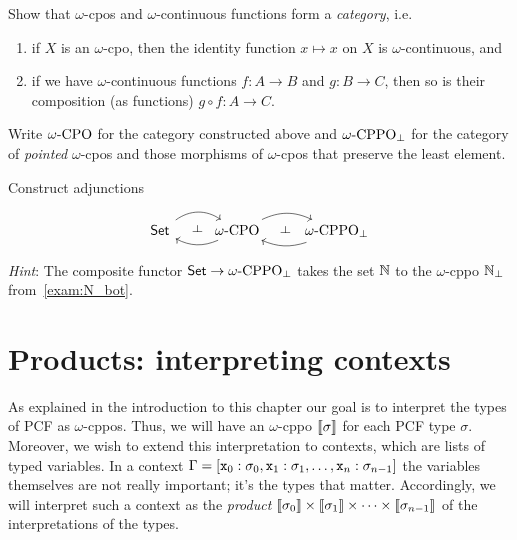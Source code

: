 \begin{exercise}\label{exer:category-of-cpos}
  Show that \(\omega\)-cpos and \(\omega\)-continuous functions form a
  \emph{category}, i.e.\
  \begin{enumerate}
  \item if \(X\) is an \(\omega\)-cpo, then the identity function
    \(x \mapsto x\) on \(X\) is \(\omega\)-continuous, and
  \item if we have \(\omega\)-continuous functions \(f \colon A \to B\) and
    \(g \colon B \to C\), then so is their composition (as functions)
    \(g \circ f \colon A \to C\). \qedhere
  \end{enumerate}
\end{exercise}

\begin{exercise}\label{exer:adjunctions}

  Write \(\omegaCPO\) for the category constructed above and \(\omegaCPPObot\)
  for the category of \emph{pointed} \(\omega\)-cpos and those morphisms of
  \(\omega\)-cpos that preserve the least element.

  Construct adjunctions
  \[
  \begin{tikzcd}
    \Set
    \arrow[r, ""{name=F}, bend left=35] &
    \omegaCPO
    \arrow[l, ""{name=G}, bend left=25]
    \arrow[phantom, from=F, to=G, "\dashv" rotate=-90]
    \arrow[r, ""{name=F}, bend left=25] &
    \omegaCPPObot
    \arrow[l, ""{name=G}, bend left=20]
    \arrow[phantom, from=F, to=G, "\dashv" rotate=-90]
  \end{tikzcd}
\]
\emph{Hint}: The composite functor \(\Set \to \omegaCPPObot\) takes the set \(\mathbb N\) to
the \(\omega\)-cppo \(\mathbb N_\bot\) from~\cref{exam:N_bot}.
\end{exercise}

\section{Products: interpreting contexts}

As explained in the introduction to this chapter our goal is to interpret the
types of PCF as \(\omega\)-cppos. Thus, we will have an \(\omega\)-cppo
\(\llbracket\sigma\rrbracket\) for each PCF type \(\sigma\).
%
Moreover, we wish to extend this interpretation to contexts, which are lists of
typed variables. In a context
\(\Gamma = [\mathtt x_0 : \sigma_0, \mathtt x_1 : \sigma_1 , \dots , \mathtt x_n :
\sigma_{n-1}]\) the variables themselves are not really important; it's the
types that matter. Accordingly, we will interpret such a context as the
\emph{product}
\(\llbracket\sigma_0\rrbracket \times \llbracket\sigma_1\rrbracket \times \cdots \times
\llbracket\sigma_{n-1}\rrbracket\) of the interpretations of the types.

